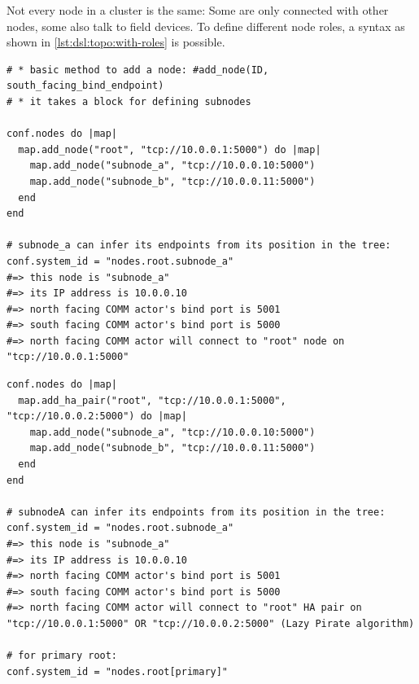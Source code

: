 Not every node in a cluster is the same: Some are only connected with other
nodes, some also talk to field devices. To define different node roles, a
syntax as shown in \autoref{lst:dsl:topo:with-roles} is possible.

\begin{lstlisting}[style=customruby,caption={Cluster DSL example without HA}, label={lst:dsl:topo:no-ha}]
# * basic method to add a node: #add_node(ID, south_facing_bind_endpoint)
# * it takes a block for defining subnodes

conf.nodes do |map|
  map.add_node("root", "tcp://10.0.0.1:5000") do |map|
    map.add_node("subnode_a", "tcp://10.0.0.10:5000")
    map.add_node("subnode_b", "tcp://10.0.0.11:5000")
  end
end

# subnode_a can infer its endpoints from its position in the tree:
conf.system_id = "nodes.root.subnode_a"
#=> this node is "subnode_a"
#=> its IP address is 10.0.0.10
#=> north facing COMM actor's bind port is 5001
#=> south facing COMM actor's bind port is 5000
#=> north facing COMM actor will connect to "root" node on "tcp://10.0.0.1:5000"
\end{lstlisting}

\begin{lstlisting}[style=customruby, caption={Cluster DSL example with HA}, label={lst:dsl:topo:with-ha}]
conf.nodes do |map|
  map.add_ha_pair("root", "tcp://10.0.0.1:5000", "tcp://10.0.0.2:5000") do |map|
    map.add_node("subnode_a", "tcp://10.0.0.10:5000")
    map.add_node("subnode_b", "tcp://10.0.0.11:5000")
  end
end

# subnodeA can infer its endpoints from its position in the tree:
conf.system_id = "nodes.root.subnode_a"
#=> this node is "subnode_a"
#=> its IP address is 10.0.0.10
#=> north facing COMM actor's bind port is 5001
#=> south facing COMM actor's bind port is 5000
#=> north facing COMM actor will connect to "root" HA pair on "tcp://10.0.0.1:5000" OR "tcp://10.0.0.2:5000" (Lazy Pirate algorithm)

# for primary root:
conf.system_id = "nodes.root[primary]"
\end{lstlisting}

